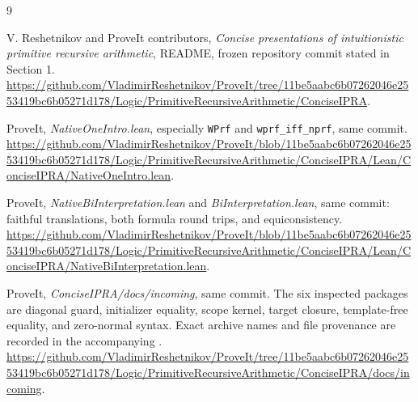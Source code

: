 \documentclass[11pt]{article}
\theoremstyle{definition}
\begin{document}
\begin{thebibliography}{9}
\raggedright
{}
V. Reshetnikov and ProveIt contributors,
\emph{Concise presentations of intuitionistic primitive recursive arithmetic},
README, frozen repository commit stated in Section 1.
\url{https://github.com/VladimirReshetnikov/ProveIt/tree/11be5aabc6b07262046e2553419bc6b05271d178/Logic/PrimitiveRecursiveArithmetic/ConciseIPRA}.

ProveIt, \emph{NativeOneIntro.lean}, especially \texttt{WPrf} and
\texttt{wprf\_iff\_nprf}, same commit.
\url{https://github.com/VladimirReshetnikov/ProveIt/blob/11be5aabc6b07262046e2553419bc6b05271d178/Logic/PrimitiveRecursiveArithmetic/ConciseIPRA/Lean/ConciseIPRA/NativeOneIntro.lean}.

ProveIt, \emph{NativeBiInterpretation.lean} and
\emph{BiInterpretation.lean}, same commit: faithful translations,
both formula round trips, and equiconsistency.
\url{https://github.com/VladimirReshetnikov/ProveIt/blob/11be5aabc6b07262046e2553419bc6b05271d178/Logic/PrimitiveRecursiveArithmetic/ConciseIPRA/Lean/ConciseIPRA/NativeBiInterpretation.lean}.

ProveIt, \emph{ConciseIPRA/docs/incoming}, same commit.
The six inspected packages are diagonal guard, initializer equality,
scope kernel, target closure, template-free equality, and zero-normal
syntax. Exact archive names and file provenance are recorded in the
accompanying .
\url{https://github.com/VladimirReshetnikov/ProveIt/tree/11be5aabc6b07262046e2553419bc6b05271d178/Logic/PrimitiveRecursiveArithmetic/ConciseIPRA/docs/incoming}.
\end{thebibliography}
\end{document}
